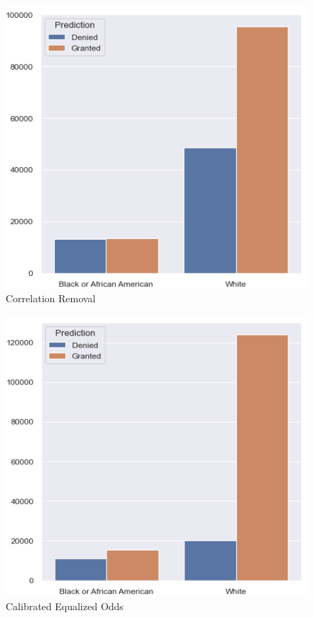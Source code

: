 \begin{figure}[!htbp]
    \begin{minipage}{0.5\textwidth}
        \centering
        \includegraphics[width=\textwidth]{images/loan_grants_by_protected_attributes/correlation_removed.png}
        \small
        Correlation Removal
    \end{minipage}\hfill
    \begin{minipage}{0.5\textwidth}
        \centering
        \includegraphics[width=\textwidth]{images/loan_grants_by_protected_attributes/calibrated_eqodds.png} 
        \small
        Calibrated Equalized Odds
    \end{minipage}
    

\end{figure}
